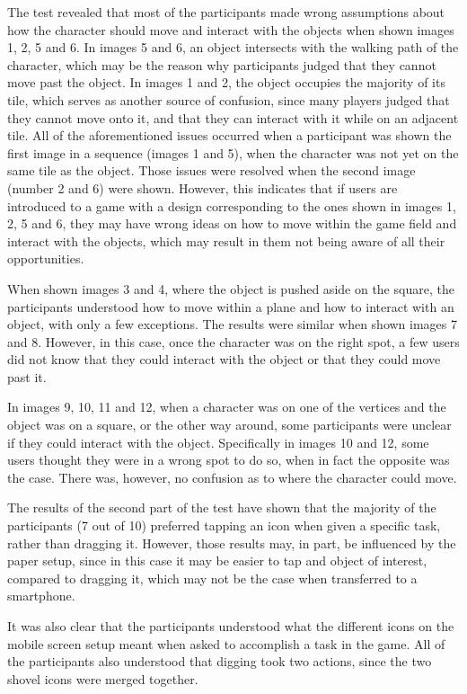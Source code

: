 The test revealed that most of the participants made wrong assumptions about how the character should move and interact with the objects when shown images 1, 2, 5 and 6. In images 5 and 6, an object intersects with the walking path of the character, which may be the reason why participants judged that they cannot move past the object. In images 1 and 2, the object occupies the majority of its tile, which serves as another source of confusion, since many players judged that they cannot move onto it, and that they can interact with it while on an adjacent tile. All of the aforementioned issues occurred when a participant was shown the first image in a sequence (images 1 and 5), when the character was not yet on the same tile as the object. Those issues were resolved when the second image (number 2 and 6) were shown. However, this indicates that if users are introduced to a game with a design corresponding to the ones shown in images 1, 2, 5 and 6, they may have wrong ideas on how to move within the game field and interact with the objects, which may result in them not being aware of all their opportunities.

When shown images 3 and 4, where the object is pushed aside on the square, the participants understood how to move within a plane and how to interact with an object, with only a few exceptions. The results were similar when shown images 7 and 8. However, in this case, once the character was on the right spot, a few users did not know that they could interact with the object or that they could move past it. 

In images 9, 10, 11 and 12, when a character was on one of the vertices and the object was on a square, or the other way around, some participants were unclear if they could interact with the object. Specifically in images 10 and 12, some users thought they were in a wrong spot to do so, when in fact the opposite was the case. There was, however, no confusion as to where the character could move.

The results of the second part of the test have shown that the majority of the participants (7 out of 10) preferred tapping an icon when given a specific task, rather than dragging it. However, those results may, in part, be influenced by the paper setup, since in this case it may be easier to tap and object of interest, compared to dragging it, which may not be the case when transferred to a smartphone. 

It was also clear that the participants understood what the different icons on the mobile screen setup meant when asked to accomplish a task in the game. All of the participants also understood that digging took two actions, since the two shovel icons were merged together. 
